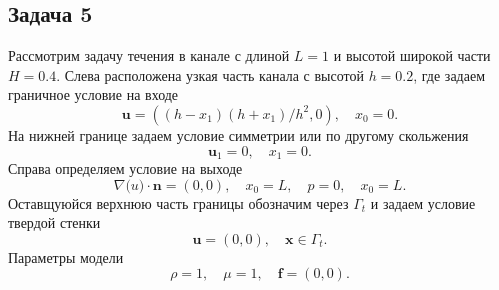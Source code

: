 \documentclass[a4paper,10pt]{report}
\begin{document}
\subsection{Задача 5}

Рассмотрим задачу течения в канале с длиной $L=1$ и высотой широкой части $H=0.4$. Слева расположена узкая часть канала с высотой $h=0.2$, где задаем граничное условие на входе
\[
    \bm{u} = \left( (h - x_1) (h + x_1)/h^2, 0 \right), \quad x_0 = 0.
\]
На нижней границе задаем условие симметрии или по другому скольжения
\[
    \bm{u}_1 = 0, \quad x_1 = 0.
\]
Справа определяем условие на выходе
\[
    \nabla \bm(u) \cdot \bm{n} = (0, 0), \quad x_0 = L, \quad
    p = 0, \quad x_0 = L.
\]
Оставщуюйся верхнюю часть границы обозначим через $\Gamma_t$ и задаем условие твердой стенки
\[
    \bm{u} = (0, 0), \quad \bm{x} \in \Gamma_t.
\]
Параметры модели 
\[
    \rho=1, \quad \mu = 1, \quad \bm{f}=(0, 0).
\]
\end{document}
